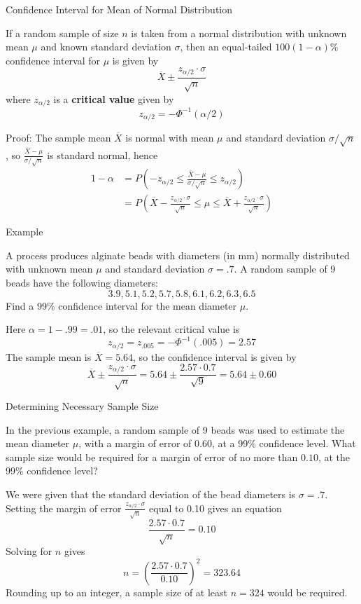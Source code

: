 \documentclass{beamer}
\renewcommand{\emph}{\textbf}
\begin{document}
\begin{frame}{Confidence Interval for Mean of Normal Distribution}
\begin{block}{}
If a random sample of size $n$ is taken from a normal distribution with unknown mean $\mu$ and known standard deviation $\sigma$, then an equal-tailed $100(1-\alpha)\%$ confidence interval for $\mu$ is given by
$$\overline X \pm \frac{z_{\alpha/2}\cdot\sigma}{\sqrt n}$$
where $z_{\alpha/2}$ is a \emph{critical value} given by
$$z_{\alpha/2} = -\Phi^{-1}(\alpha/2)$$
\end{block}
\pause
Proof: The sample mean $\overline{X}$ is normal with mean $\mu$ and standard deviation $\sigma/\sqrt{n}$, so $\frac{\overline{X}-\mu}{\sigma/\sqrt n}$ is standard normal, hence
\small\begin{align*}
1-\alpha &= P\left(-z_{\alpha/2} \leq \frac{\overline X-\mu}{\sigma/\sqrt n} \leq z_{\alpha/2}\right) \\
&= P\left(\overline X-\frac{z_{\alpha/2}\cdot\sigma}{\sqrt n} \leq \mu \leq \overline X+\frac{z_{\alpha/2}\cdot\sigma}{\sqrt n}\right) 
\end{align*}
\end{frame}

\begin{frame}{Example}
\begin{block}{}
A process produces alginate beads
with diameters (in mm) normally distributed with unknown mean $\mu$ and standard deviation
$\sigma=.7$. A random sample of 9 beads have the following diameters:
$$3.9, 5.1, 5.2, 5.7, 5.8, 6.1, 6.2, 6.3, 6.5$$
Find a 99\% confidence interval for the mean diameter $\mu$.
\end{block}
\pause Here $\alpha=1-.99=.01$, so the relevant critical value is 
$$z_{\alpha/2}=z_{.005} = -\Phi^{-1}(.005) = 2.57$$
\pause The sample mean is $\overline X=5.64$, so the confidence interval is given by
$$\overline X \pm \frac{z_{\alpha/2} \cdot \sigma}{\sqrt n} = 5.64 \pm \frac{2.57 \cdot 0.7}{\sqrt{9}} = 5.64 \pm  0.60$$
\end{frame}

\begin{frame}{Determining Necessary Sample Size}
\begin{block}{}
In the previous example, a random sample of 9 beads was used to estimate the mean diameter $\mu$, with a margin of error of $0.60$, at a 99\% confidence level. What sample size would be required for a margin of error of no more than $0.10$, at the 99\% confidence level?
\end{block}
\pause
We were given that the standard deviation of the bead diameters is $\sigma=.7$. 
 Setting the margin of error $\frac{z_{\alpha/2} \cdot \sigma}{\sqrt n}$ equal to 0.10 gives an equation
$$ \frac{2.57 \cdot 0.7}{\sqrt n} = 0.10$$
\pause Solving for $n$ gives $$n=\left(\frac{2.57\cdot0.7}{0.10}\right)^2=323.64$$
\pause Rounding up to an integer, a sample size of at least $n=324$ would be required.
\end{frame}
\end{document}
